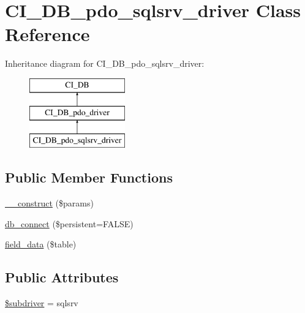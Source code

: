 \hypertarget{class_c_i___d_b__pdo__sqlsrv__driver}{}\section{C\+I\+\_\+\+D\+B\+\_\+pdo\+\_\+sqlsrv\+\_\+driver Class Reference}
\label{class_c_i___d_b__pdo__sqlsrv__driver}
Inheritance diagram for C\+I\+\_\+\+D\+B\+\_\+pdo\+\_\+sqlsrv\+\_\+driver\+:\begin{figure}[H]
\begin{center}
\leavevmode
\includegraphics[height=3.000000cm]{class_c_i___d_b__pdo__sqlsrv__driver}
\end{center}
\end{figure}
\subsection*{Public Member Functions}
\begin{DoxyCompactItemize}
\item 
\mbox{\hyperlink{class_c_i___d_b__pdo__sqlsrv__driver_a9162320adff1a1a4afd7f2372f753a3e}{\+\_\+\+\_\+construct}} (\$params)
\item 
\mbox{\hyperlink{class_c_i___d_b__pdo__sqlsrv__driver_a52bf595e79e96cc0a7c907a9b45aeb4d}{db\+\_\+connect}} (\$persistent=F\+A\+L\+SE)
\item 
\mbox{\hyperlink{class_c_i___d_b__pdo__sqlsrv__driver_a90355121e1ed009e0efdbd544ab56efa}{field\+\_\+data}} (\$table)
\end{DoxyCompactItemize}
\subsection*{Public Attributes}
\begin{DoxyCompactItemize}
\item 
\mbox{\hyperlink{class_c_i___d_b__pdo__sqlsrv__driver_a1322ca756348b11d080cb7a4f590de15}{\$subdriver}} = \textquotesingle{}sqlsrv\textquotesingle{}
\end{DoxyCompactItemize}
